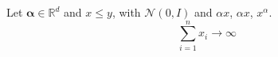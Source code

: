 Let $\boldsymbol{\alpha} \in \mathbb{R}^d$ and $x \leq y$, with $\mathcal{N}(0, I)$ and $\alpha x$, $\alpha x$, $x^\alpha$.
\[ \sum_{i=1}^{n} x_i \rightarrow \infty \]
